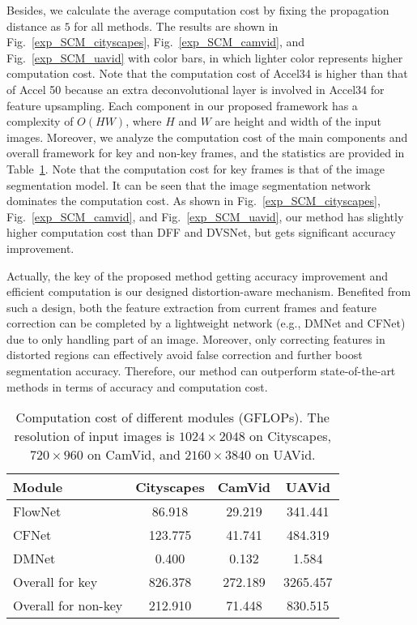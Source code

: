 \documentclass[journal]{IEEEtran}
\begin{document}
Besides, we calculate the average computation cost by fixing the propagation distance as $5$ for all methods. The results are shown in Fig.~\ref{exp_SCM_cityscapes}, Fig.~\ref{exp_SCM_camvid}, and Fig.~\ref{exp_SCM_uavid} with color bars, in which lighter color represents higher computation cost. Note that the computation cost of Accel34 is higher than that of Accel 50 because an extra deconvolutional layer is involved in Accel34 for feature upsampling. Each component in our proposed framework has a complexity of $O(HW)$, where $H$ and $W$ are height and width of the input images. Moreover, we analyze the computation cost of the main components and overall framework for key and non-key frames, and the statistics are provided in Table~\ref{computaion}. Note that the computation cost for key frames is that of the image segmentation model. It can be seen that the image segmentation network dominates the computation cost. As shown in Fig.~\ref{exp_SCM_cityscapes}, Fig.~\ref{exp_SCM_camvid}, and Fig.~\ref{exp_SCM_uavid}, our method has slightly higher computation cost than DFF and DVSNet, but gets significant accuracy improvement.

Actually, the key of the proposed method getting accuracy improvement and efficient computation is our designed distortion-aware mechanism. Benefited from such a design, both the feature extraction from current frames and feature correction can be completed by a lightweight network (e.g., DMNet and CFNet) due to only handling part of an image.  Moreover, only correcting features in distorted regions can effectively avoid false correction and further boost segmentation accuracy. Therefore, our method can outperform state-of-the-art methods in terms of accuracy and computation cost.


\begin{table}[t]
	\caption{Computation cost of different modules (GFLOPs). The resolution of input images is $1024\times2048$ on Cityscapes, $720\times960$ on CamVid, and $2160\times3840$ on UAVid.}
	\begin{center}
		\renewcommand{\arraystretch}{1.3}
		\begin{tabular}{l|c|c|c}
			\hline
			Module             	& Cityscapes	& CamVid	& UAVid    	\\
			\hline
			FlowNet 			& 86.918		& 29.219	& 341.441	\\
			CFNet 				& 123.775		& 41.741	& 484.319	\\
			DMNet 				& 0.400			& 0.132		& 1.584		\\
			\hline
			Overall for key		& 826.378		& 272.189	& 3265.457	\\
			Overall for non-key	& 212.910		& 71.448	& 830.515	\\
			\hline
		\end{tabular}
	\end{center}
	\label{computaion}
\end{table}
\end{document}
